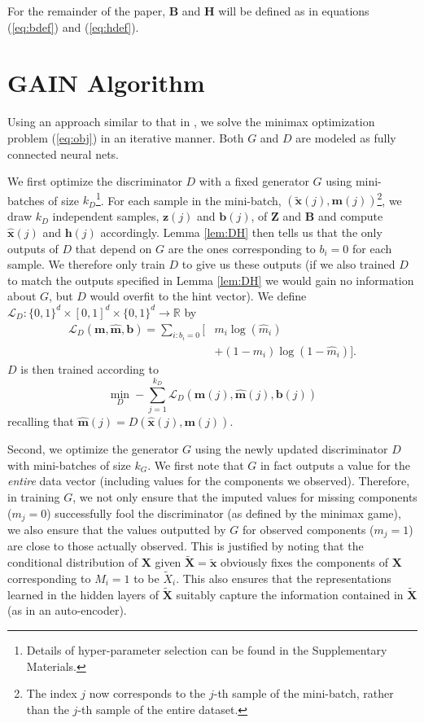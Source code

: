 \documentclass{article}
\begin{document}
For the remainder of the paper, $\mathbf{B}$ and $\mathbf{H}$ will be defined as in equations (\ref{eq:bdef}) and (\ref{eq:hdef}).

\section{GAIN Algorithm}\label{sect:gain_algorithm}

Using an approach similar to that in \cite{GAN}, we solve the minimax optimization problem (\ref{eq:obj}) in an iterative manner. Both $G$ and $D$ are modeled as fully connected neural nets.

We first optimize the discriminator $D$ with a fixed generator $G$ using mini-batches of size $k_{D}$\footnote{Details of hyper-parameter selection can be found in the Supplementary Materials.}. For each sample in the mini-batch, $(\tilde{\mathbf{x}}(j), \mathbf{m}(j))$\footnote{The index $j$ now corresponds to the $j$-th sample of the mini-batch, rather than the $j$-th sample of the entire dataset.}, we draw $k_D$ independent samples, $\mathbf{z}(j)$ and $\mathbf{b}(j)$, of $\mathbf{Z}$ and $\mathbf{B}$ and compute $\hat{\mathbf{x}}(j)$ and $\mathbf{h}(j)$ accordingly. Lemma \ref{lem:DH} then tells us that the only outputs of $D$ that depend on $G$ are the ones corresponding to $b_i = 0$ for each sample. We therefore only train $D$ to give us these outputs (if we also trained $D$ to match the outputs specified in Lemma \ref{lem:DH} we would gain no information about $G$, but $D$ would overfit to the hint vector). We define $\mathcal{L}_D : \{0, 1\}^d \times [0, 1]^d \times \{0, 1\}^d \to \mathbb{R}$ by
\begin{align}
\mathcal{L}_D(\mathbf{m}, \hat{\mathbf{m}}, \mathbf{b}) = \sum_{i : b_i = 0} \Big[&m_i\log(\hat{m}_{i})\\\nonumber
&+ (1-m_{i})\log(1-\hat{m}_{i})\Big].
\end{align}
$D$ is then trained according to
\begin{equation} \label{eq:dloss2}
\min_D -\sum_{j=1}^{k_D} \mathcal{L}_D(\mathbf{m}(j), \hat{\mathbf{m}}(j), \mathbf{b}(j))
\end{equation}
recalling that $\hat{\mathbf{m}}(j) = D(\hat{\mathbf{x}}(j), \mathbf{m}(j))$.

Second, we optimize the generator $G$ using the newly updated discriminator $D$ with mini-batches of size $k_{G}$. We first note that $G$ in fact outputs a value for the {\em entire} data vector (including values for the components we observed). Therefore, in training $G$, we not only ensure that the imputed values for missing components ($m_j = 0$) successfully fool the discriminator (as defined by the minimax game), we also ensure that the values outputted by $G$ for observed components ($m_j = 1$) are close to those actually observed. This is justified by noting that the conditional distribution of $\mathbf{X}$ given $\tilde{\mathbf{X}} = \tilde{\mathbf{x}}$ obviously fixes the components of $\mathbf{X}$ corresponding to $M_i = 1$ to be $\tilde{X}_i$. This also ensures that the representations learned in the hidden layers of $\tilde{\mathbf{X}}$ suitably capture the information contained in $\tilde{\mathbf{X}}$ (as in an auto-encoder).
\end{document}
